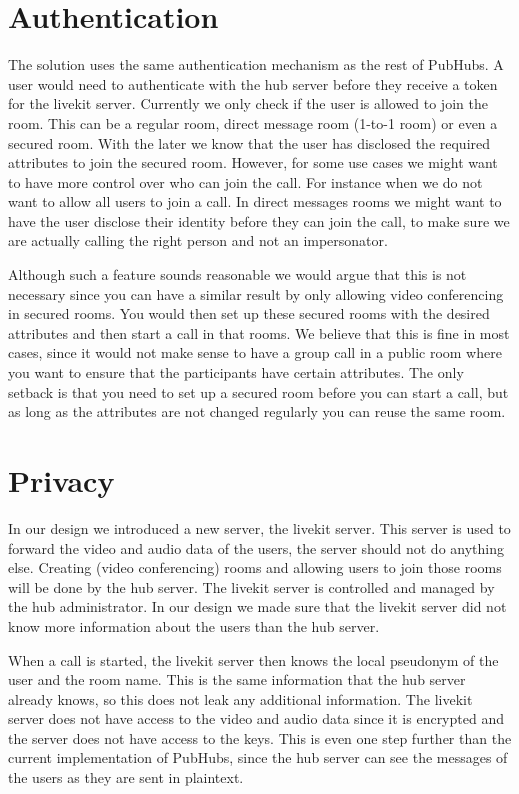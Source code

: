 \documentclass{report}
\begin{document}
\section{Authentication}
The solution uses the same authentication mechanism as the rest of PubHubs. A user would need to authenticate with the
hub server before they receive a token for the livekit server. Currently we only check if the user is allowed to
join the room. This can be a regular room, direct message room (1-to-1 room) or even a secured room. With the later we know that the user has
disclosed the required attributes to join the secured room. However, for some use cases we might want to have more
control over who can join the call. For instance when we do not want to allow all users to join a call. In direct
messages rooms we might want to have the user disclose their identity before they can join the call, to
make sure we are actually calling the right person and not an impersonator.

Although such a feature sounds reasonable we would argue that this is not necessary since you can have a similar
result by only allowing video conferencing in secured rooms. You would then set up these secured rooms with the
desired attributes and then start a call in that rooms. We believe that this is fine in most cases, since it would
not make sense to have a group call in a public room where you want to ensure that the participants have certain attributes.
The only setback is that you need to set up a secured room before you can start a call, but as long as the attributes
are not changed regularly you can reuse the same room.

\section{Privacy}
In our design we introduced a new server, the livekit server. This server is used to forward the video and audio data
of the users, the server should not do anything else. Creating (video conferencing) rooms and allowing users to join
those rooms will be done by the hub server. The livekit server is controlled and managed by the hub administrator. In
our design we made sure that the livekit server did not know more information about the users than the hub server.

When a call is started, the livekit server then knows the local pseudonym of the user and the room name. This is the
same information that the hub server already knows, so this does not leak any additional information. The livekit server
does not have access to the video and audio data since it is encrypted and the server does not have access to the keys.
This is even one step further than the current implementation of PubHubs, since the hub server can see the messages of
the users as they are sent in plaintext.
\end{document}
